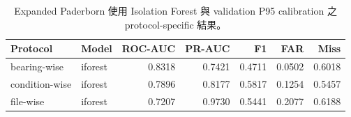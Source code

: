 \begin{table}[H]
\caption{Expanded Paderborn 使用 Isolation Forest 與 validation P95 calibration 之 protocol-specific 結果。}
\label{tab:paderborn_expanded}
\centering
\small
\begin{tabular}{l l r r r r r}
\toprule
Protocol & Model & ROC-AUC & PR-AUC & F1 & FAR & Miss \\
\midrule
bearing-wise & iforest & 0.8318 & 0.7421 & 0.4711 & 0.0502 & 0.6018 \\
condition-wise & iforest & 0.7896 & 0.8177 & 0.5817 & 0.1254 & 0.5457 \\
file-wise & iforest & 0.7207 & 0.9730 & 0.5441 & 0.2077 & 0.6188 \\
\bottomrule
\end{tabular}
\end{table}
